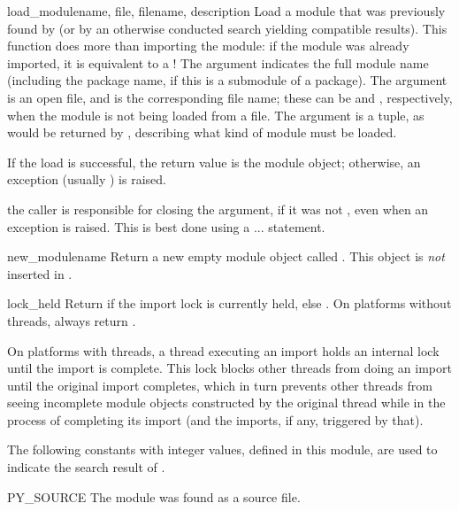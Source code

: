 \begin{funcdesc}{load_module}{name, file, filename, description}
Load a module that was previously found by  (or by
an otherwise conducted search yielding compatible results).  This
function does more than importing the module: if the module was
already imported, it is equivalent to a
!  The  argument
indicates the full module name (including the package name, if this is
a submodule of a package).  The  argument is an open file,
and  is the corresponding file name; these can be
 and , respectively, when the module is not being
loaded from a file.  The  argument is a tuple, as
would be returned by , describing what kind
of module must be loaded.

If the load is successful, the return value is the module object;
otherwise, an exception (usually ) is raised.

 the caller is responsible for closing the
 argument, if it was not , even when an exception
is raised.  This is best done using a 
...  statement.
\end{funcdesc}

\begin{funcdesc}{new_module}{name}
Return a new empty module object called .  This object is
\emph{not} inserted in .
\end{funcdesc}

\begin{funcdesc}{lock_held}{}
Return  if the import lock is currently held, else .
On platforms without threads, always return .

On platforms with threads, a thread executing an import holds an internal
lock until the import is complete.
This lock blocks other threads from doing an import until the original
import completes, which in turn prevents other threads from seeing
incomplete module objects constructed by the original thread while in
the process of completing its import (and the imports, if any,
triggered by that).
\end{funcdesc}

The following constants with integer values, defined in this module,
are used to indicate the search result of .

\begin{datadesc}{PY_SOURCE}
The module was found as a source file.
\end{datadesc}

